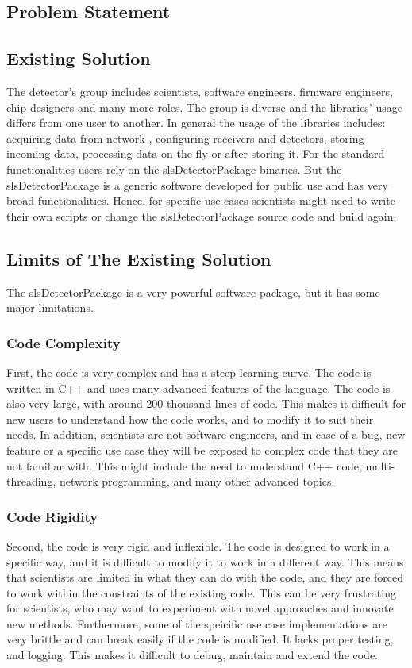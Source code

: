 \begin{spacing}{1.2}
    \section{Problem Statement}
    \subsection{Existing Solution}
    The detector's group includes scientists, software engineers, firmware engineers, chip designers and many more roles.
    The group is diverse and the libraries' usage differs from one user to another. In general the usage of the libraries includes: acquiring data from network
    , configuring receivers and detectors, storing incoming data, processing data on the fly or after storing it.
    For the standard functionalities users rely on the slsDetectorPackage binaries. But the slsDetectorPackage is a generic software
    developed for public use and has very broad functionalities. Hence, for specific use cases scientists might need to write their own scripts
    or change the slsDetectorPackage source code and build again.
    \subsection{Limits of The Existing Solution}
    The slsDetectorPackage is a very powerful software package, but it has some major limitations.
    \subsubsection{Code Complexity}
    First, the code is very complex and has a steep learning curve. The code is written in C++ and uses
    many advanced features of the language. The code is also very large, with around 200 thousand lines of code.
    This makes it difficult for new users to understand how the code works, and to modify it to suit their needs.
    In addition, scientists are not software engineers, and in case of a bug, new feature or a specific use case
    they will be exposed to complex code that they are not familiar with. This might include the need to understand
    C++ code, multi-threading, network programming, and many other advanced topics.


    \subsubsection{Code Rigidity}
    Second, the code is very rigid and inflexible. The code is designed to work in a specific way, and it is difficult
    to modify it to work in a different way. This means that scientists are limited in what they can do with the code,
    and they are forced to work within the constraints of the existing code. This can be very frustrating for scientists,
    who may want to experiment with novel approaches and innovate new methods.
    Furthermore, some of the speicific use case implementations are very brittle and can break easily if the code is modified.
    It lacks proper testing, and logging. This makes it difficult to debug, maintain and extend the code.



\end{spacing}
